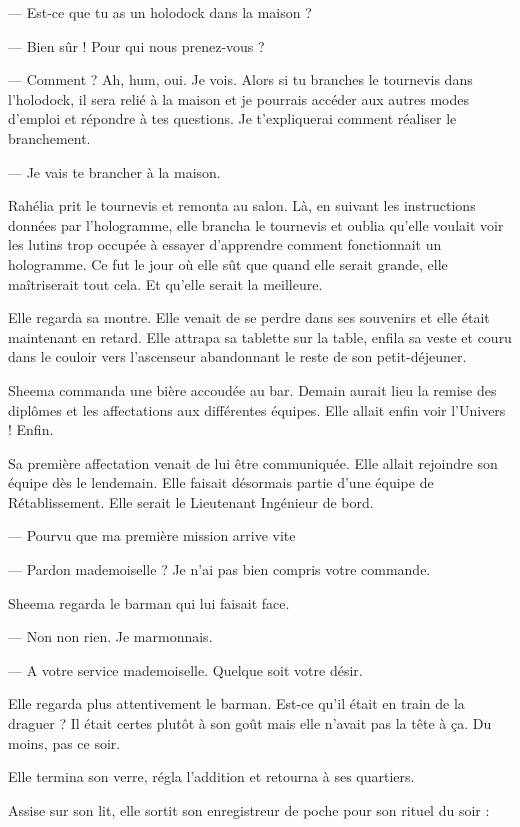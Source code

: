   — Est-ce que tu as un holodock dans la maison ?

  — Bien sûr ! Pour qui nous prenez-vous ?

— Comment ? Ah, hum, oui. Je vois. Alors si tu branches le tournevis dans
l'holodock, il sera relié à la maison et je pourrais accéder aux autres modes
d'emploi et répondre à tes questions. Je t'expliquerai comment réaliser le
branchement.

  — Je vais te brancher à la maison.

Rahélia prit le tournevis et remonta au salon. Là, en suivant les instructions
données par l'hologramme, elle brancha le tournevis et oublia qu'elle voulait
voir les lutins trop occupée à essayer d'apprendre comment fonctionnait un
hologramme. Ce fut le jour où elle sût que quand elle serait grande, elle
maîtriserait tout cela. Et qu'elle serait la meilleure.

Elle regarda sa montre. Elle venait de se perdre dans ses souvenirs et elle
était maintenant en retard. Elle attrapa sa tablette sur la table, enfila sa
veste et couru dans le couloir vers l’ascenseur abandonnant le reste de son
petit-déjeuner.




Sheema commanda une bière accoudée au bar. Demain aurait lieu la remise des
diplômes et les affectations aux différentes équipes. Elle allait enfin voir
l'Univers ! Enfin.

Sa première affectation venait de lui être communiquée. Elle allait rejoindre
son équipe dès le lendemain. Elle faisait désormais partie d'une équipe de
Rétablissement. Elle serait le Lieutenant Ingénieur de bord.

--- Pourvu que ma première mission arrive vite

--- Pardon mademoiselle ? Je n'ai pas bien compris votre commande.

Sheema regarda le barman qui lui faisait face.

--- Non non rien. Je marmonnais.

--- A votre service mademoiselle. Quelque soit votre désir.

Elle regarda plus attentivement le barman. Est-ce qu'il était en train de la
draguer ? Il était certes plutôt à son goût mais elle n'avait pas la tête à ça.
Du moins, pas ce soir.

Elle termina son verre, régla l'addition et retourna à ses quartiers.

Assise sur son lit, elle sortit son enregistreur de poche pour son rituel du
soir :

